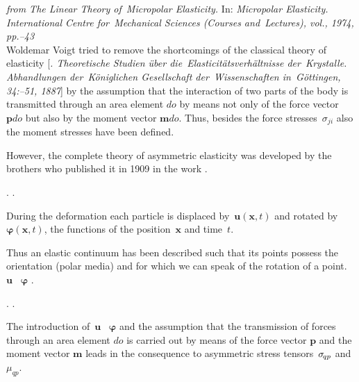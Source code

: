 \begin{tcolorbox}[breakable, enhanced, colback = orange!8, before upper={\parindent3.2ex}, parbox = false]
\small%
\setlength{\abovedisplayskip}{2pt}\setlength{\belowdisplayskip}{2pt}%

\noindent \textit{from  The Linear Theory of~Micropolar Elasticity.} In: \textit{Micropolar Elasticity. International Centre for~Mechanical Sciences (Courses and~Lectures), vol., 1974, pp.\hbox{--}43}
\\[.555em]
%
\indent Woldemar Voigt tried to remove the shortcomings of the classical theory of elasticity [\textit{. Theoretische Studien über die~Elasticitätsverhältnisse der~Krystalle. Abhandlungen der~Königlichen Gesellschaft der~Wissenschaften in~Göttingen, 34:\hbox{--}51, 1887}] by the assumption that the interaction of two parts of the body is transmitted through an area element $do$ by means not only of the force vector $\bm{p}do$ but also by the moment vector $\bm{m}do$. Thus, besides the force stresses~$\sigma_{ji}$ also the moment stresses have been defined.

However, the complete theory of asymmetric elasticity was developed by the brothers  who published it in 1909 in the work \textit{}.

.
.

During the deformation each particle is displaced by~$\bm{u}(\bm{x},t)$ and rotated by~$\bm{\varphi}(\bm{x},t)$,
the functions of the position~$\bm{x}$ and time~$t$.

Thus an elastic continuum has been described such that its points possess the orientation (polar media) and for which we can speak of the rotation of a point.
~$\bm{u}$ ~$\bm{\varphi}$
.

.
.




The introduction of~$\bm{u}$ ~$\bm{\varphi}$ and the assumption that the transmission of forces through an area element $do$ is carried out by means of the force vector $\bm{p}$ and the moment vector $\bm{m}$ leads in the consequence to asymmetric stress tensors~$\sigma_{\hspace{-0.25ex}qp}$ and~$\mu_{qp}$.


\end{tcolorbox}
